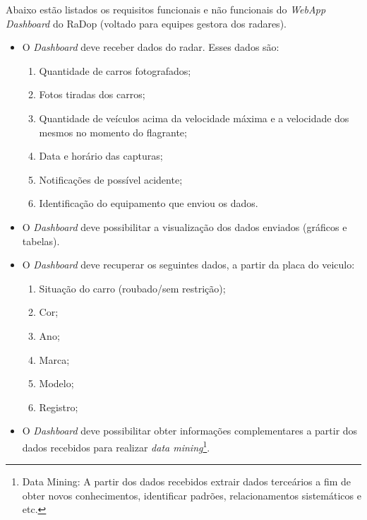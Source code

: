Abaixo estão listados os requisitos funcionais e não funcionais do \textit{WebApp Dashboard} do RaDop (voltado para equipes gestora dos radares).

\begin{itemize}
    \item O \textit{Dashboard} deve receber dados do radar. Esses dados são:
    \begin{enumerate}
        \item Quantidade de carros fotografados;
        \item Fotos tiradas dos carros;
        \item Quantidade de veículos acima da velocidade máxima e a velocidade dos mesmos no momento do flagrante;
        \item Data e horário das capturas;
        \item Notificações de possível acidente;
        \item Identificação do equipamento que enviou os dados.
    \end{enumerate}
\end{itemize}

\begin{itemize}
    \item O \textit{Dashboard} deve possibilitar a visualização dos dados enviados (gráficos e tabelas).
\end{itemize}

\begin{itemize}
    \item O \textit{Dashboard} deve recuperar os seguintes dados, a partir da placa do veiculo:
    \begin{enumerate}
        \item Situação do carro (roubado/sem restrição);
        \item Cor;
        \item Ano;
        \item Marca;
        \item Modelo;
        \item Registro;
    \end{enumerate}
\end{itemize}

\begin{itemize}

    \item O \textit{Dashboard} deve possibilitar obter informações complementares a partir dos dados recebidos para realizar \textit{data mining}\footnote{Data Mining: A partir dos dados recebidos extrair dados terceários a fim de obter novos conhecimentos, identificar padrões, relacionamentos sistemáticos e etc.}. 
\end{itemize}

